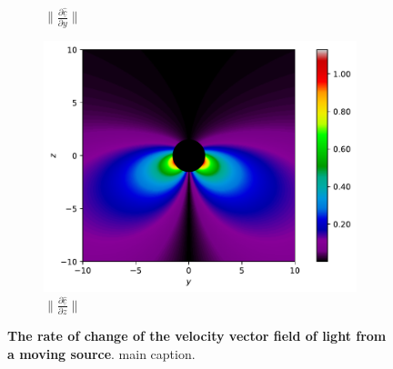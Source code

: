 \begin{figure}[H]
\begin{subfigure}{0.32\textwidth}
		\caption{$\|\frac{\partial \underline{\hat{c}}}{\partial y}\|$}
		\label{fig: Rate of change of lights velocity field subfig_2}
	\end{subfigure}
	\begin{subfigure}{0.32\textwidth}
		\centering
		\includegraphics[width=\textwidth]{images/pdf/Rate_of_change_of_lights_velocity_field_with_respect_to_z.pdf}
		\caption{$\|\frac{\partial \underline{\hat{c}}}{\partial z}\|$}
		\label{fig: Rate of change of lights velocity field subfig_3}
	\end{subfigure}
	\caption{\textbf{The rate of change of the velocity vector field of light from a moving source}. main caption.}
	\label{fig: Rate of change of lights velocity field}
\end{figure}

